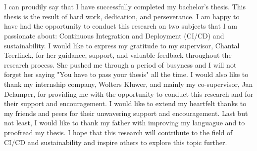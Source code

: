 
\chapter*{}%
\label{ch:voorwoord}


I can proudily say that I have successfully completed my bachelor's thesis. This thesis is the result of hard work, dedication, and perseverance. I am happy to have had the opportunity to conduct this research on two subjects that I am passionate about: Continuous Integration and Deployment (CI/CD) and sustainability.
I would like to express my gratitude to my supervisor, Chantal Teerlinck, for her guidance, support, and valuable feedback throughout the research process. She pushed me through a period of busyness and I will not forget her saying "You have to pass your thesis" all the time. I would also like to thank my internship company, Wolters Kluwer, and mainly my co-supervisor, Jan Delamper, for providing me with the opportunity to conduct this research and for their support and encouragement. 
I would like to extend my heartfelt thanks to my friends and peers for their unwavering support and encouragement. Last but not least, I would like to thank my father with improving my languague and to proofread my thesis. 
I hope that this research will contribute to the field of CI/CD and sustainability and inspire others to explore this topic further.